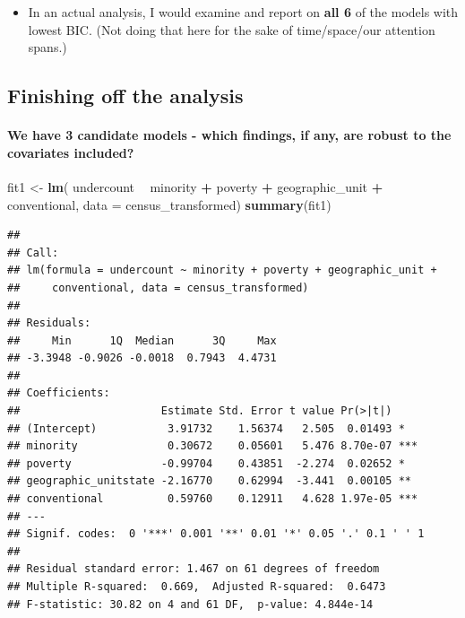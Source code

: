 \documentclass[landscape]{article}
\newenvironment{Shaded}{\begin{snugshade}}{\end{snugshade}}
\newcommand{\KeywordTok}[1]{\textcolor[rgb]{0.13,0.29,0.53}{\textbf{#1}}}
\newcommand{\DataTypeTok}[1]{\textcolor[rgb]{0.13,0.29,0.53}{#1}}
\newcommand{\StringTok}[1]{\textcolor[rgb]{0.31,0.60,0.02}{#1}}
\newcommand{\OperatorTok}[1]{\textcolor[rgb]{0.81,0.36,0.00}{\textbf{#1}}}
\newcommand{\NormalTok}[1]{#1}
\providecommand{\tightlist}{%
  \setlength{\itemsep}{0pt}\setlength{\parskip}{0pt}}
\let\oldparagraph\paragraph
\renewcommand{\paragraph}[1]{\oldparagraph{#1}\mbox{}}
\begin{document}
\begin{itemize}
\tightlist
\item
  In an actual analysis, I would examine and report on \textbf{all 6} of
  the models with lowest BIC. (Not doing that here for the sake of
  time/space/our attention spans.)
\end{itemize}

\newpage

\subsection{Finishing off the
analysis}\label{finishing-off-the-analysis}

\paragraph{We have 3 candidate models - which findings, if any, are
robust to the covariates
included?}\label{we-have-3-candidate-models---which-findings-if-any-are-robust-to-the-covariates-included}

\begin{Shaded}
\begin{Highlighting}[]
\NormalTok{fit1 <-}\StringTok{ }\KeywordTok{lm}\NormalTok{(}
\NormalTok{  undercount }\OperatorTok{~}\StringTok{ }\NormalTok{minority }\OperatorTok{+}\StringTok{ }\NormalTok{poverty }\OperatorTok{+}\StringTok{ }\NormalTok{geographic_unit }\OperatorTok{+}\StringTok{ }\NormalTok{conventional,}
  \DataTypeTok{data =}\NormalTok{ census_transformed)}
\KeywordTok{summary}\NormalTok{(fit1)}
\end{Highlighting}
\end{Shaded}

\begin{verbatim}
## 
## Call:
## lm(formula = undercount ~ minority + poverty + geographic_unit + 
##     conventional, data = census_transformed)
## 
## Residuals:
##     Min      1Q  Median      3Q     Max 
## -3.3948 -0.9026 -0.0018  0.7943  4.4731 
## 
## Coefficients:
##                      Estimate Std. Error t value Pr(>|t|)    
## (Intercept)           3.91732    1.56374   2.505  0.01493 *  
## minority              0.30672    0.05601   5.476 8.70e-07 ***
## poverty              -0.99704    0.43851  -2.274  0.02652 *  
## geographic_unitstate -2.16770    0.62994  -3.441  0.00105 ** 
## conventional          0.59760    0.12911   4.628 1.97e-05 ***
## ---
## Signif. codes:  0 '***' 0.001 '**' 0.01 '*' 0.05 '.' 0.1 ' ' 1
## 
## Residual standard error: 1.467 on 61 degrees of freedom
## Multiple R-squared:  0.669,  Adjusted R-squared:  0.6473 
## F-statistic: 30.82 on 4 and 61 DF,  p-value: 4.844e-14
\end{verbatim}
\end{document}
